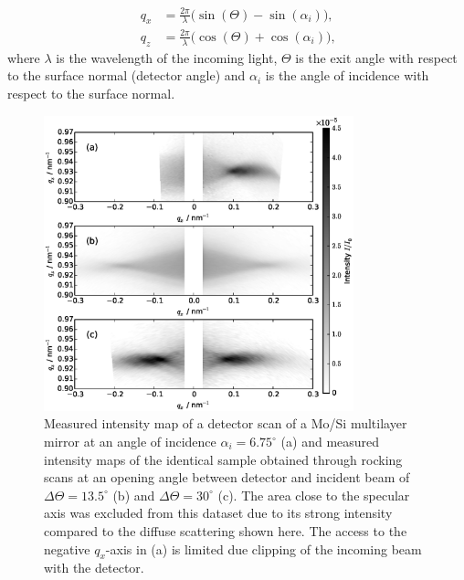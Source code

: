 \begin{align}
        q_x &= \frac{2 \pi}{\lambda} \big(\sin(\Theta) - \sin(\alpha_i)\big) \text{,}\\
        q_z &= \frac{2\pi}{\lambda} \big(\cos(\Theta) + \cos(\alpha_i)\big) \text{,} 
\end{align}
where $\lambda$ is the wavelength of the incoming light, $\Theta$ is the exit angle with respect to the surface normal (detector angle) and $\alpha_i$ is the angle of incidence with respect to the surface normal.

\begin{figure}
        \includegraphics[width=
        0.8\textwidth]{img/im_mo_si/measured_maps} \caption{Measured intensity map of a detector scan of a Mo/Si multilayer mirror at an angle of incidence $\alpha_i = 6.75^\circ$ (a) and  measured intensity maps of the identical sample obtained through rocking scans at an opening angle between detector and incident beam of $\Delta \Theta = 13.5^\circ$ (b) and $\Delta \Theta = 30^\circ$ (c). The area close to the specular axis was excluded from this dataset due to its strong intensity compared to the diffuse scattering shown here. The access to the negative $q_x$-axis in (a) is limited due clipping of the incoming beam with the detector.} \label{fig:comparison} 
\end{figure}
